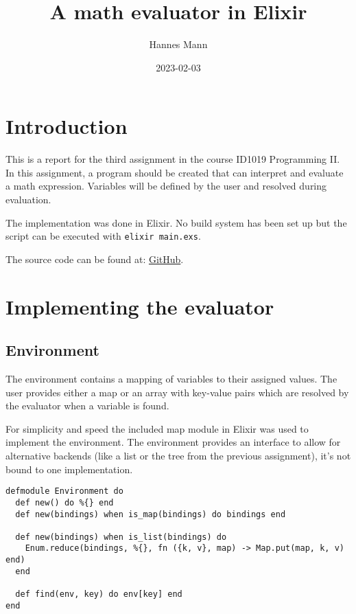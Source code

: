 \documentclass[a4paper,11pt]{article}
\begin{document}
\title{
    \textbf{A math evaluator in Elixir}
}
\author{Hannes Mann}
\date{2023-02-03}

\maketitle

\section*{Introduction}

This is a report for the third assignment in the course ID1019 Programming II.
In this assignment, a program should be created that can interpret and evaluate a math expression. Variables will be defined by the user and resolved during evaluation.

The implementation was done in Elixir. No build system has been set up but the script can be executed with \texttt{elixir main.exs}.

The source code can be found at: \href{https://github.com/hannesmann/ID1019/tree/main/src/math}{GitHub}.

\section*{Implementing the evaluator}

\subsection*{Environment}

The environment contains a mapping of variables to their assigned values. The user provides either a map or an array with key-value pairs which are resolved by the evaluator when a variable is found.

For simplicity and speed the included map module in Elixir was used to implement the environment.
The environment provides an interface to allow for alternative backends (like a list or the tree from the previous assignment), it's not bound to one implementation.

\begin{verbatim}
defmodule Environment do
  def new() do %{} end
  def new(bindings) when is_map(bindings) do bindings end

  def new(bindings) when is_list(bindings) do
    Enum.reduce(bindings, %{}, fn ({k, v}, map) -> Map.put(map, k, v) end)
  end

  def find(env, key) do env[key] end
end
\end{verbatim}
\end{document}
